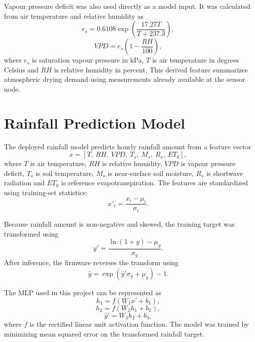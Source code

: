 \documentclass[12pt,a4paper]{report}
\begin{document}
Vapour pressure deficit was also used directly as a model input. It was calculated from air temperature and relative humidity as
\begin{equation}
	e_s = 0.6108\exp\left(\frac{17.27T}{T+237.3}\right),
\end{equation}
\begin{equation}
	VPD = e_s\left(1-\frac{RH}{100}\right),
	\label{eq:vpd}
\end{equation}
where $e_s$ is saturation vapour pressure in kPa, $T$ is air temperature in degrees Celsius and $RH$ is relative humidity in percent. This derived feature summarizes atmospheric drying demand using measurements already available at the sensor node.

\section{Rainfall Prediction Model}
The deployed rainfall model predicts hourly rainfall amount from a feature vector
\begin{equation}
	x = [T,\ RH,\ VPD,\ T_s,\ M_s,\ R_s,\ ET_0],
\end{equation}
where $T$ is air temperature, $RH$ is relative humidity, $VPD$ is vapour pressure deficit, $T_s$ is soil temperature, $M_s$ is near-surface soil moisture, $R_s$ is shortwave radiation and $ET_0$ is reference evapotranspiration. The features are standardized using training-set statistics:
\begin{equation}
	x'_i = \frac{x_i-\mu_i}{\sigma_i}.
	\label{eq:standardization}
\end{equation}

Because rainfall amount is non-negative and skewed, the training target was transformed using
\begin{equation}
	y' = \frac{\ln(1+y)-\mu_y}{\sigma_y}.
	\label{eq:target_transform}
\end{equation}
After inference, the firmware reverses the transform using
\begin{equation}
	\hat{y} = \exp(\hat{y}'\sigma_y+\mu_y)-1.
	\label{eq:inverse_transform}
\end{equation}

The MLP used in this project can be represented as
\begin{equation}
	h_1 = f(W_1x'+b_1),
\end{equation}
\begin{equation}
	h_2 = f(W_2h_1+b_2),
\end{equation}
\begin{equation}
	\hat{y}' = W_3h_2+b_3,
\end{equation}
where $f$ is the rectified linear unit activation function. The model was trained by minimizing mean squared error on the transformed rainfall target.
\end{document}
